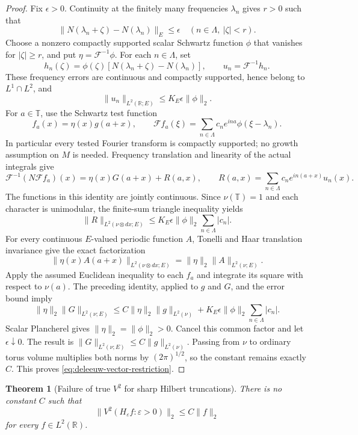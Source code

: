 \documentclass[11pt]{article}
\numberwithin{equation}{section}
\newtheorem{theorem}{Theorem}[section]
\theoremstyle{remark}
\theoremstyle{definition}
\begin{document}
\begin{proof}
Fix $\epsilon>0$.  Continuity at the finitely many frequencies
$\lambda_n$ gives $r>0$ such that
\[
 \|N(\lambda_n+\zeta)-N(\lambda_n)\|_E\le\epsilon
 \quad(n\in\Lambda,\ |\zeta|<r).
\]
Choose a nonzero compactly supported scalar Schwartz function $\phi$
that vanishes for $|\zeta|\ge r$, and put
$\eta=\mathscr F^{-1}\phi$.  For each $n\in\Lambda$, set
\[
 h_n(\zeta)=\phi(\zeta)
   [N(\lambda_n+\zeta)-N(\lambda_n)],
 \qquad u_n=\mathscr F^{-1}h_n.
\]
These frequency errors are continuous and compactly supported, hence
belong to $L^1\cap L^2$, and
\[
 \|u_n\|_{L^2(\mathbb R;E)}
 \le K_E\epsilon\|\phi\|_2.
\]
For $a\in\mathbb T$, use the Schwartz test function
\[
 f_a(x)=\eta(x)g(a+x),\qquad
 \mathscr F f_a(\xi)
 =\sum_{n\in\Lambda}c_ne^{ina}\phi(\xi-\lambda_n).
\]
In particular every tested Fourier transform is compactly supported;
no growth assumption on $M$ is needed.  Frequency translation and
linearity of the actual integrals give
\[
 \mathscr F^{-1}(N\mathscr F f_a)(x)
 =\eta(x)G(a+x)+R(a,x),\qquad
 R(a,x)=\sum_{n\in\Lambda}c_ne^{in(a+x)}u_n(x).
\]
The functions in this identity are jointly continuous.  Since
$\nu(\mathbb T)=1$ and each character is unimodular, the finite-sum
triangle inequality yields
\[
 \|R\|_{L^2(\nu\otimes dx;E)}
 \le K_E\epsilon\|\phi\|_2\sum_{n\in\Lambda}|c_n|.
\]
For every continuous $E$-valued periodic function $A$, Tonelli and Haar
translation invariance give the exact factorization
\[
 \|\eta(x)A(a+x)\|_{L^2(\nu\otimes dx;E)}
 =\|\eta\|_2\|A\|_{L^2(\nu;E)}.
\]
Apply the assumed Euclidean inequality to each $f_a$ and integrate its
square with respect to $\nu(a)$.  The preceding identity, applied to
$g$ and $G$, and the error bound imply
\[
 \|\eta\|_2\|G\|_{L^2(\nu;E)}
 \le C\|\eta\|_2\|g\|_{L^2(\nu)}
   +K_E\epsilon\|\phi\|_2\sum_{n\in\Lambda}|c_n|.
\]
Scalar Plancherel gives $\|\eta\|_2=\|\phi\|_2>0$.  Cancel this common
factor and let $\epsilon\downarrow0$.  The result is
$\|G\|_{L^2(\nu;E)}\le C\|g\|_{L^2(\nu)}$.
Passing from $\nu$ to ordinary torus volume multiplies both norms by
$(2\pi)^{1/2}$, so the constant remains exactly $C$.  This proves
\eqref{eq:deleeuw-vector-restriction}.
\end{proof}

\begin{theorem}[Failure of true $V^2$ for sharp Hilbert truncations]
\label{thm:hilbert-v2-failure}
There is no constant $C$ such that
\begin{equation}\label{eq:hilbert-v2-false}
 \|V^2(H_\varepsilon f:\varepsilon>0)\|_2\le C\|f\|_2
\end{equation}
for every $f\in L^2(\mathbb R)$.
\end{theorem}
\end{document}
